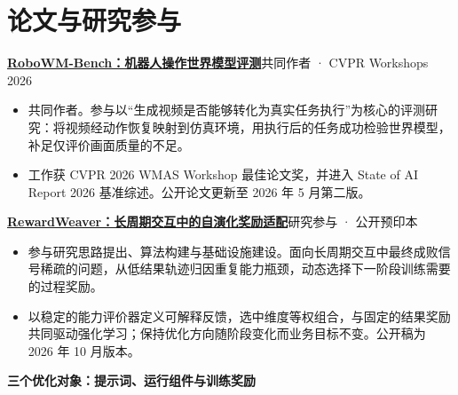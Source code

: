 \documentclass[10pt,a4paper,UTF8,fontset=fandol]{ctexart}
\begin{document}
\section{论文与研究参与}
\textbf{\href{https://arxiv.org/abs/2604.19092}{RoboWM-Bench：机器人操作世界模型评测}}\hfill{\small 共同作者 · CVPR Workshops 2026}\par
\begin{itemize}
\item 共同作者。参与以“生成视频是否能够转化为真实任务执行”为核心的评测研究：将视频经动作恢复映射到仿真环境，用执行后的任务成功检验世界模型，补足仅评价画面质量的不足。
\item 工作获 CVPR 2026 WMAS Workshop 最佳论文奖，并进入 State of AI Report 2026 基准综述。公开论文更新至 2026 年 5 月第二版。
\end{itemize}
\textbf{\href{https://arxiv.org/abs/2610.10120}{RewardWeaver：长周期交互中的自演化奖励适配}}\hfill{\small 研究参与 · 公开预印本}\par
\begin{itemize}
\item 参与研究思路提出、算法构建与基础设施建设。面向长周期交互中最终成败信号稀疏的问题，从低结果轨迹归因重复能力瓶颈，动态选择下一阶段训练需要的过程奖励。
\item 以稳定的能力评价器定义可解释反馈，选中维度等权组合，与固定的结果奖励共同驱动强化学习；保持优化方向随阶段变化而业务目标不变。公开稿为 2026 年 10 月版本。
\end{itemize}
\begin{center}
{\small\bfseries 三个优化对象：提示词、运行组件与训练奖励}\par\vspace{4pt}
\par\vspace{2pt}{\footnotesize 图 3｜三项工作共享反馈迭代思路，但修改对象不同；这是方法对照，不表示三个系统已经串成同一条流水线。}
\end{center}
\end{document}
